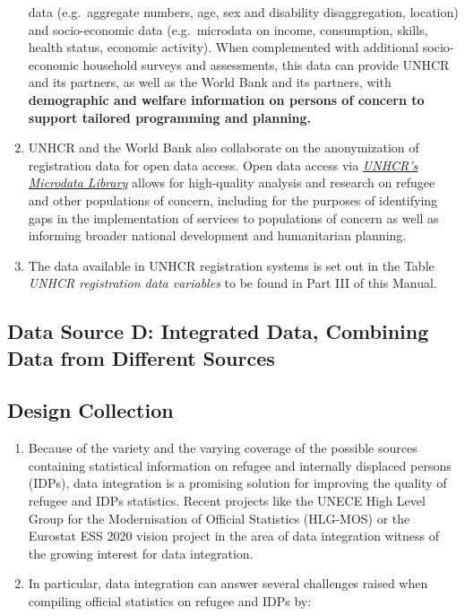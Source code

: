 \documentclass[
]{article}
\begin{document}
\begin{enumerate}
  data (e.g.~aggregate numbers, age, sex and disability
  disaggregation, location) and socio-economic data (e.g.~microdata on
  income, consumption, skills, health status, economic activity). When
  complemented with additional socio-economic household surveys and
  assessments, this data can provide UNHCR and its partners, as well
  as the World Bank and its partners, with \textbf{demographic and welfare
  information on persons of concern to support tailored programming
  and planning.}
\item
  UNHCR and the World Bank also collaborate on the anonymization of
  registration data for open data access. Open data access via
  \href{https://microdata.unhcr.org/index.php/home}{\emph{UNHCR's Microdata
  Library}} allows for
  high-quality analysis and research on refugee and other populations
  of concern, including for the purposes of identifying gaps in the
  implementation of services to populations of concern as well as
  informing broader national development and humanitarian planning.
\item
  The data available in UNHCR registration systems is set out in the
  Table \emph{UNHCR registration data variables} to be found in Part III of
  this Manual.
\end{enumerate}

\hypertarget{data-source-d-integrated-data-combining-data-from-different-sources-1}{%
\subsection{Data Source D: Integrated Data, Combining Data from Different Sources}\label{data-source-d-integrated-data-combining-data-from-different-sources-1}}

\hypertarget{design-collection-7}{%
\subsection{Design Collection}\label{design-collection-7}}

\begin{enumerate}
\def\labelenumi{\arabic{enumi}.}
\setcounter{enumi}{195}
\item
  Because of the variety and the varying coverage of the possible
  sources containing statistical information on refugee and internally
  displaced persons (IDPs), data integration is a promising solution
  for improving the quality of refugee and IDPs statistics. Recent
  projects like the UNECE High Level Group for the Modernisation of
  Official Statistics (HLG-MOS) or the Eurostat ESS 2020 vision
  project in the area of data integration witness of the growing
  interest for data integration.
\item
  In particular, data integration can answer several challenges
  raised when compiling official statistics on refugee and IDPs by:
\end{enumerate}
\end{document}
